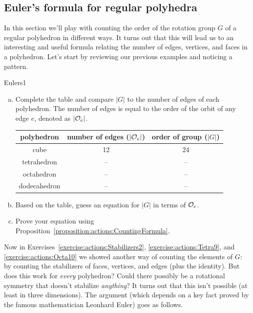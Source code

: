 \subsection{Euler's formula for regular polyhedra}\label{sec:actions:Euler}
In this section we'll play with counting the order of the rotation group $G$ of a regular polyhedron in different ways. It turns out that this will lead us to an interesting and useful formula relating the number of edges, vertices, and faces in a polyhedron.
Let's start by reviewing our previous examples and noticing a pattern.

\begin{exercise}{Eulers1}
\begin{enumerate}[(a)]
\item
Complete the table and compare $|G|$ to the number of edges of each polyhedron.  The number of edges is equal to the order of the orbit of any edge $e$, denoted as $|{\cal O}_e|$.

\begin{tabular}{|c | c | c|}\hline
polyhedron & number of edges ($|{\cal O}_e|$) & order of group ($|G|$)\\ \hline
cube &  12 &   24\\ \hline
tetrahedron &  -- &   --\\ \hline
octahedron & -- &--\\ \hline
dodecahedron &  --&--\\ \hline 
\end{tabular}
\item Based on the table, guess an equation for $|G|$ in terms of ${\cal O}_e$.
\item 
Prove your equation using Proposition~\ref{proposition:actions:CountingFormula}.
\end{enumerate}
\end {exercise}
 Now in Exercises~\ref{exercise:actions:Stabilizers2}, \ref{exercise:actions:Tetra9}, and \ref{exercise:actions:Octa10}  we showed another way of counting the elements of $G$: by counting the stabilizers of faces, vertices, and edges (plus the identity). But does this work for \emph{every} polyhedron? Could there possibly be a rotational symmetry that doesn't stabilize \emph{anything}? It turns out that this isn't possible (at least in three dimensions). The argument (which depends on a key fact proved by the famous mathematician Leonhard Euler) goes as follows. 

